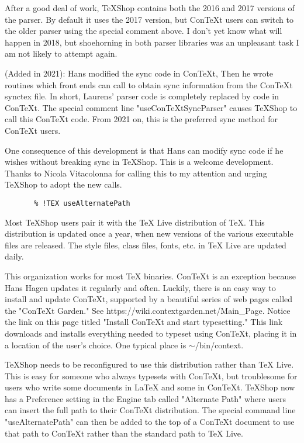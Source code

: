 \documentclass[11pt, oneside]{article}   	%
\begin{document}
After a good deal of work, TeXShop contains both the 2016 and 2017 versions of the parser. By default it uses the 2017 version, but ConTeXt users can switch to the older parser using the special comment above. I don't yet know what will happen in 2018, but shoehorning in both parser libraries was an unpleasant task I am not likely to attempt again.

(Added in 2021): Hans modified the sync code in ConTeXt, Then he wrote routines which front ends can call to obtain  sync information from the ConTeXt synctex file. In short, Laurens' parser code is completely replaced by code in ConTeXt. The special comment line "useConTeXtSyncParser" causes TeXShop to call this ConTeXt code. From 2021 on, this is the preferred sync method for ConTeXt users. 

One consequence of this development is that Hans can  modify sync code if he wishes without breaking sync in TeXShop. This is a welcome development. Thanks to Nicola Vitacolonna for calling this to my attention and urging TeXShop to adopt the new calls.


\begin{verbatim}
       % !TEX useAlternatePath
\end{verbatim}
 
 Most TeXShop users pair it with the TeX Live distribution of TeX. This distribution is updated once a year, when new versions of the various executable files are released. The style files, class files, fonts, etc. in TeX Live are updated daily.
 
 This organization works for most TeX binaries. ConTeXt is an exception because Hans Hagen updates it regularly and often. Luckily, there is an easy way to install and update ConTeXt, supported by a beautiful series of web pages called the "ConTeXt Garden." See https://wiki.contextgarden.net/Main\_Page. Notice the link on this page titled "Install ConTeXt and start typesetting." This link downloads and installs everything needed to typeset using ConTeXt, placing it in a location of the user's choice. One typical place is $\sim$/bin/context. 
 
TeXShop needs to be reconfigured to use this distribution rather than TeX Live. This is easy for someone who always typesets with ConTeXt, but troublesome for users who write some documents in LaTeX and some in ConTeXt. TeXShop now has a Preference setting in the Engine tab called "Alternate Path" where users can insert the full path to their ConTeXt distribution. The special command line "useAlternatePath" can then be added to the top of a ConTeXt document to use that path to ConTeXt rather than the standard path to TeX Live.
\end{document}
